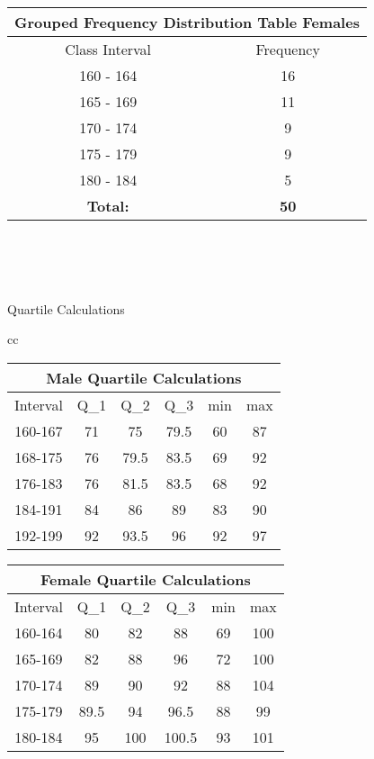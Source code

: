\begin{center}
\def\arraystretch{1}
{\setlength{\tabcolsep}{5em}
\begin{tabular}{|| c | c ||} 
\hline
\multicolumn{2}{||c||}{Grouped Frequency Distribution Table \textbf{Females}} \\
\hline
 \hline
   Class Interval & Frequency\\ [0.5ex] 
 \hline
160 - 164 & 16\\
 \hline
165 - 169	& 11\\
 \hline
170 - 174	& 9\\
 \hline
175 - 179	& 9\\
 \hline
180 - 184	& 5\\
 \hline
  \textbf{Total:} & \textbf{50}\\
  \hline
\end{tabular}}
\end{center}
\\\\
\\

\begin{table}[h]
    \centering
    \caption{Quartile Calculations}
    \label{tab:table4}
\end{table}

\begin{center}
    \begin{tabular}{ cc }   %
    \def\arraystretch{1}
    \begin{tabular}{|| c | c | c | c | c | c ||}
    \hline
    \multicolumn{6}{||c||}{Male Quartile Calculations} \\
    \hline
    Interval & Q_1 & Q_2 & Q_3 & min & max\\
    \hline
    160-167 & 71 & 75 & 79.5 & 60 & 87\\ 
    168-175 & 76 & 79.5 & 83.5 & 69 & 92\\
    176-183 & 76 & 81.5 & 83.5 & 68 & 92\\
    184-191 & 84 & 86 & 89 & 83 & 90\\
    192-199 & 92 & 93.5 & 96 & 92 & 97\\
    \hline
    \end{tabular}
    
    \def\arraystretch{1}
    \begin{tabular}{|| c | c | c | c | c | c ||}
    \hline
    \multicolumn{6}{||c||}{Female Quartile Calculations} \\
    \hline
    Interval & Q_1 & Q_2 & Q_3 & min & max\\
    \hline
    160-164 & 80 & 82 & 88 & 69 & 100\\ 
    165-169 & 82 & 88 & 96 & 72 & 100\\
    170-174 & 89 & 90 & 92 & 88 & 104\\
    175-179 & 89.5 & 94 & 96.5 & 88 & 99\\
    180-184 & 95 & 100 & 100.5 & 93 & 101\\
    \hline
    \end{tabular}
\end{tabular}
\end{center}

